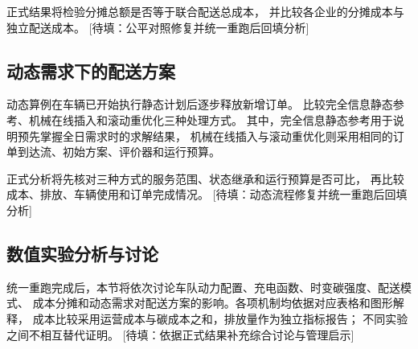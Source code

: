 \documentclass{setp-new}
\DeclareRobustCommand{\TBD}[1]{%
  \begingroup\setlength{\fboxsep}{1.2pt}%
  \colorbox{black!12}{\textcolor{black!65}{\textsf{\footnotesize[待填：#1]}}}%
  \endgroup}
\begin{document}
正式结果将检验分摊总额是否等于联合配送总成本，
并比较各企业的分摊成本与独立配送成本。\TBD{公平对照修复并统一重跑后回填分析}

\subsection{动态需求下的配送方案}

动态算例在车辆已开始执行静态计划后逐步释放新增订单。
比较完全信息静态参考、机械在线插入和滚动重优化三种处理方式。
其中，完全信息静态参考用于说明预先掌握全日需求时的求解结果，
机械在线插入与滚动重优化则采用相同的订单到达流、初始方案、评价器和运行预算。

\begin{table}[H]
  \centering
  \caption{动态需求下不同处理方式的求解结果}
  \label{tab:dynamic}
  \scriptsize
\end{table}

正式分析将先核对三种方式的服务范围、状态继承和运行预算是否可比，
再比较成本、排放、车辆使用和订单完成情况。\TBD{动态流程修复并统一重跑后回填分析}

\subsection{数值实验分析与讨论}

统一重跑完成后，本节将依次讨论车队动力配置、充电函数、时变碳强度、配送模式、
成本分摊和动态需求对配送方案的影响。各项机制均依据对应表格和图形解释，
成本比较采用运营成本与碳成本之和，排放量作为独立指标报告；
不同实验之间不相互替代证明。\TBD{依据正式结果补充综合讨论与管理启示}
\end{document}
